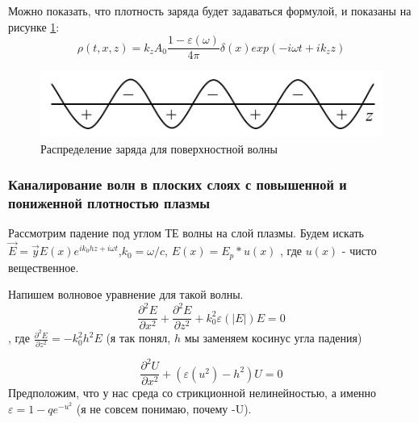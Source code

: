 \documentclass[10pt, a4paper]{article}
\begin{document}
Можно показать, что плотность заряда будет задаваться формулой, и показаны на рисунке \ref{fig:pov_volna}:
\begin{equation}
	\rho(t,x,z)=k_z A_0 \frac{1-\varepsilon(\omega)}{4\pi} \delta(x) exp(- i \omega t + ik_z z)
\end{equation}

\begin{figure}
	\begin{center}
		\includegraphics[width=0.5\linewidth]{Pov_volna.JPG}
	\end{center}
\caption{Распределение заряда для поверхностной волны}
\label{fig:pov_volna}
\end{figure}


\subsubsection{Каналирование волн в плоских слоях с повышенной и пониженной плотностью плазмы}

Рассмотрим падение под углом ТЕ волны на слой плазмы. Будем искать $\vec E = \vec y E(x) e^{i k_0 h z + i \omega t}$,$k_0=\omega / c$, $E(x)=E_p * u(x)$ , где $u(x)$ - чисто вещественное.

Напишем волновое уравнение для такой волны.
\begin{equation}
	\frac{\partial^2 E}{\partial x^2} + \frac{\partial^2 E}{\partial z^2} + k_0^2 \varepsilon(|E|) E=0
\end{equation}
, где $ \frac{\partial^2 E}{\partial z^2}=-k_0^2h^2E$ (я так понял, $h$ мы заменяем косинус угла падения)

\begin{equation}
	\frac{\partial^2 U}{\partial x^2} + (\varepsilon(u^2)-h^2)U=0
\end{equation}
Предположим, что у нас среда со стрикционной нелинейностью, а именно $\varepsilon=1-q e^{-u^2}$ (я не совсем понимаю, почему -U).
\end{document}

